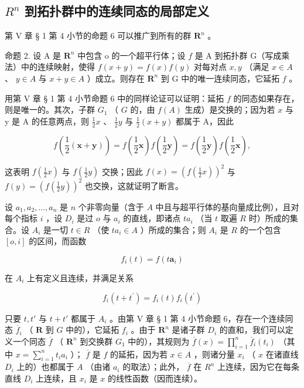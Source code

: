 \subsection{\texorpdfstring{\(R^{n}\) 到拓扑群中的连续同态的局部定义}{R 的 n 次幂到拓扑群中的连续同态的局部定义}}

第 V 章 § 1 第 4 小节的命题 6 可以推广到所有的群 \(\mathbf{R}^n\) 。

命题 2. 设 A 是 \(\mathbf{R}^n\) 中包含 o 的一个超平行体；设 \(f\) 是 A 到拓扑群 G（写成乘法）中的连续映射，使得 \(f(x + y) = f(x)f(y)\) 对每对点 \(x, y\) （满足 \(x \in A\) 、 \(y \in A\) 与 \(x + y \in A\) ）成立。则存在 \(\mathbf{R}^n\) 到 G 中的唯一连续同态，它延拓 \(f\) 。

用第 V 章 § 1 第 4 小节命题 6 中的同样论证可以证明：延拓 \(f\) 的同态如果存在，则是唯一的。其次，子群 \(G_1\) （ \(G\) 的，由 \(f(A)\) 生成）是交换的；因为若 \(x\) 与 y 是 A 的任意两点，则 \(\frac{1}{2}x\) 、 \(\frac{1}{2}y\) 与 \(\frac{1}{2}(x+y)\) 都属于 A，因此

\[
f \left(\frac {1}{2} (\boldsymbol {x} + \boldsymbol {y})\right) = f \left(\frac {1}{2} \boldsymbol {x}\right) f \left(\frac {1}{2} \boldsymbol {y}\right) = f \left(\frac {1}{2} \boldsymbol {y}\right) f \left(\frac {1}{2} \boldsymbol {x}\right),
\]

这表明 \(f(\frac{1}{2} x)\) 与 \(f(\frac{1}{2} y)\) 交换；因此 \(f(x) = (f(\frac{1}{2} x))^2\) 与 \(f(y) = (f(\frac{1}{2} y))^2\) 也交换，这就证明了断言。

设 \(a_1, a_2, \ldots, a_n\) 是 \(n\) 个非零向量（含于 \(A\) 中且与超平行体的基向量成比例），且对每个指标 \(i\) ，设 \(D_i\) 是过 \(o\) 与 \(a_i\) 的直线，即诸点 \(ta_i\) （当 \(t\) 取遍 \(R\) 时）所成的集合。设 \(A_i\) 是一切 \(t \in R\) （使 \(ta_i \in A\) ）所成的集合；则 \(A_i\) 是 \(R\) 的一个包含 \([o, i]\) 的区间，而函数

\[
f _ {i} (t) = f \left(t \boldsymbol {a} _ {i}\right)
\]

在 \(A_{i}\) 上有定义且连续，并满足关系

\[
f _ {i} (t + t ^ {\prime}) = f _ {i} (t) f _ {i} (t ^ {\prime})
\]

只要 \(t, t'\) 与 \(t + t'\) 都属于 \(A_i\) 。由第 V 章 § 1 第 4 小节命题 6，存在一个连续同态 \(\overline{f}_i\) （ \(\mathbf{R}\) 到 \(G\) 中的），它延拓 \(f_i\) 。由于 \(\mathbf{R}^n\) 是诸子群 \(D_i\) 的直和，我们可以定义一个同态 \(\overline{f}\) （ \(\mathbf{R}^n\) 到交换群 \(G_1\) 中的），其规则为 \(\overline{f}(x) = \prod_{i=1}^{n} \overline{f}_i(t_i)\) （其中 \(x = \sum_{i=1}^{n} t_i a_i\) ）； \(\overline{f}\) 是 \(f\) 的延拓，因为若 \(x \in A\) ，则诸分量 \(x_i\) （ \(x\) 在诸直线 \(D_i\) 上的）也都属于 \(A\) （由诸 \(a_i\) 的取法）；此外， \(\overline{f}\) 在 \(R^n\) 上连续，因为它在每条直线 \(D_i\) 上连续，且 \(x_i\) 是 \(x\) 的线性函数（因而连续）。

